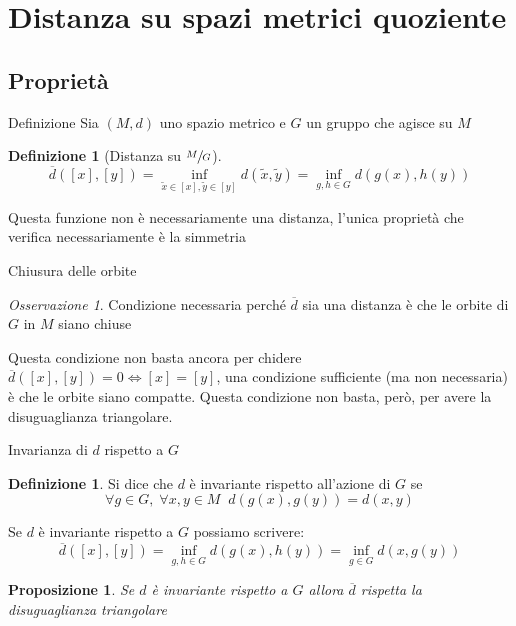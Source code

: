 \documentclass{beamer}
\newcounter{counter1}
\theoremstyle{plain}
\newtheorem{mypro}[counter1]{Proposizione}
\theoremstyle{definition}
\newtheorem{mydef}[counter1]{Definizione}
\theoremstyle{remark}
\newtheorem{myoss}[counter1]{Osservazione}
\newcommand{\obar}[1]{\overline{#1}}
\newcommand{\bra}[1]{\left[#1\right]}
\begin{document}
\section{Distanza su spazi metrici quoziente}

\subsection{Proprietà}

\begin{frame}{Definizione}
  Sia $(M,d)$ uno spazio metrico e $G$ un gruppo che agisce su $M$
  \begin{mydef}[Distanza su $\sfrac{M}{G}$]
    \[ \obar d (\bra{x}, \bra{y}) = \inf _{\tilde x \in \bra{x} ,
      \tilde y \in \bra {y}} d(\tilde x , \tilde y) = \inf _ {g,h \in
      G} d(g(x), h(y)) \]
  \end{mydef}

  Questa funzione non è necessariamente una distanza, l'unica
  proprietà che verifica necessariamente è la simmetria
\end{frame}

\begin{frame}{Chiusura delle orbite}
  \begin{myoss}
    Condizione necessaria perché $\obar d$ sia una distanza è che le
    orbite di $G$ in $M$ siano chiuse
  \end{myoss}
  
  Questa condizione non basta ancora per chidere $\obar d(\bra{x},
  \bra{y}) = 0 \Leftrightarrow \bra{x} = \bra{y}$, una condizione
  sufficiente (ma non necessaria) è che le orbite siano
  compatte. Questa condizione non basta, però, per avere la
  disuguaglianza triangolare.
\end{frame}

\begin{frame}{Invarianza di $d$ rispetto a $G$}
  \begin{mydef}
    Si dice che $d$ è invariante rispetto all'azione di $G$ se
    \[ \forall g \in G,\; \forall x,y \in M \;\; d(g(x),g(y)) = d(x,y) \]
  \end{mydef}
  Se $d$ è invariante rispetto a $G$ possiamo scrivere:
  \[ \obar d (\bra{x}, \bra{y}) = \inf _ {g,h \in G} d(g(x), h(y)) =
  \inf _{g \in G} d(x,g(y)) \]

  \begin{mypro}
    Se $d$ è invariante rispetto a $G$ allora $\obar d$ rispetta la
    disuguaglianza triangolare
  \end{mypro}
\end{frame}
\end{document}
